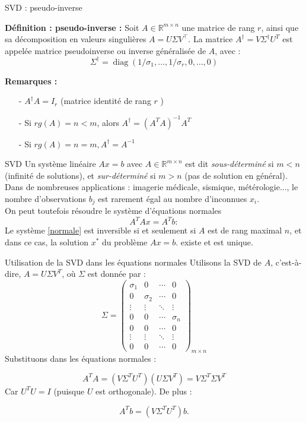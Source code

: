 \documentclass[french, 10pt]{beamer}
\theoremstyle{definition}
\begin{document}
\begin{frame}{SVD : pseudo-inverse}
	
	\textbf{Définition : pseudo-inverse :} Soit $A \in \mathbb{R}^{m \times n}$ une matrice de rang $r$, ainsi que sa décomposition en valeurs singulières $A=U \Sigma V^{\top}$.
	La matrice $A^{\dagger}=V \Sigma^{\dagger} U^T$ est appelée matrice pseudoinverse ou inverse généralisée de $A$, avec :
	$$
	\Sigma^{\dagger}=\operatorname{diag}\left(1 / \sigma_1, \ldots, 1 / \sigma_r, 0, \ldots, 0\right)
	$$
	
	\textbf{Remarques :}
	\begin{itemize}
		\item[-] $A^{\dagger} A=I_r$ (matrice identité de rang $r$ )
		\item[-] Si $r g(A)=n<m$, alors $A^{\dagger}=\left(A^T A\right)^{-1} A^T$
		\item[-] Si $r g(A)=n=m, A^{\dagger}=A^{-1}$
	\end{itemize}
\end{frame}
\begin{frame}{SVD}
	Un système linéaire $A x = b$ avec $A \in \mathbb{R}^{m \times n}$ est dit \textit{sous-déterminé} si \( m < n \) (infinité de solutions), et \textit{sur-déterminé} si \( m > n \) (pas de solution en
	général).
	\\
	Dans de nombreuses applications : imagerie médicale, sismique, métérologie..., le nombre d’observations $b_j$ est rarement égal au nombre d’inconnues $x_i$.
	\\
	On peut toutefois résoudre le système d'équations normales \begin{equation}
	A^T A x = A^T b : \label{normale}
	\end{equation}
	Le système \eqref{normale} est inversible si et seulement si $A$ est de rang
	maximal $n$, et dans ce cas, la solution $x^*$ du problème $Ax=b$.
	existe et est unique.
\end{frame}
\begin{frame}{Utilisation de la SVD dans les équations normales}
	Utilisons la SVD de \( A \), c'est-à-dire, \( A = U \Sigma V^T \), où $\Sigma$ est donnée par :
	\[
	\Sigma = \begin{pmatrix}
	\sigma_1 & 0 & \cdots & 0 \\
	0 & \sigma_2 & \cdots & 0 \\
	\vdots & \vdots & \ddots & \vdots \\
	0 & 0 & \cdots & \sigma_n \\
	0 & 0 & \cdots & 0 \\
	\vdots & \vdots & \ddots & \vdots \\
	0 & 0 & \cdots & 0
	\end{pmatrix}_{m \times n}
	\]
	Substituons dans les équations normales :
	
	\[
	A^T A = (V \Sigma^T U^T)(U \Sigma V^T) = V \Sigma^T \Sigma V^T
	\]
	Car \( U^T U = I \) (puisque \( U \) est orthogonale). De plus :
	
	\[
	A^T b = (V \Sigma^T U^T) b.
	\]
	
\end{frame}
\end{document}
